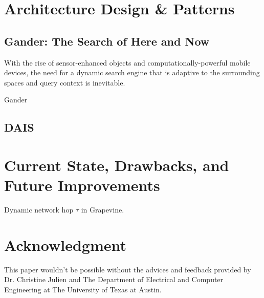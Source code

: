 \documentclass[11pt,onecolumn]{article}
\begin{document}
\section{Architecture Design \& Patterns}

\subsection{Gander: The Search of Here and Now}
With the rise of sensor-enhanced objects and computationally-powerful mobile devices, the need for a dynamic search engine that is adaptive to the surrounding spaces and query context is inevitable. 

Gander \cite{michel2012mygander}

\subsection{DAIS}
	
\section{Current State, Drawbacks, and Future Improvements}

Dynamic network hop $\tau$ in Grapevine.


\section*{Acknowledgment}
This paper wouldn't be possible without the advices and feedback provided by Dr. Christine Julien and The Department of Electrical and Computer Engineering at The University of Texas at Austin.



\end{document}
